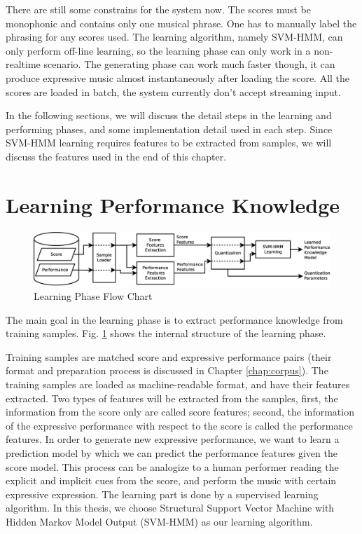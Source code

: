 There are still some constrains for the system now. The scores must be monophonic and contains only one musical phrase. One has to manually label the phrasing for any scores used. The learning algorithm, namely SVM-HMM, can only perform off-line learning, so the learning phase can only work in a non-realtime scenario. The generating phase can work much faster though, it can produce expressive music almost instantaneously after loading the score. All the scores are loaded in batch, the system currently don't accept streaming input.

In the following sections, we will discuss the detail steps in the learning and performing phases, and some implementation detail used in each step. Since SVM-HMM learning requires features to be extracted from samples, we will discuss the features used in the end of this chapter.


\section{Learning Performance Knowledge}
\label{sec:learn}
\begin{figure}[tp]
   \begin{center}
      \includegraphics[width=\textwidth]{fig/learn_arch}
   \end{center}
   \caption{Learning Phase Flow Chart} 
   \label{fig:learnflow}
\end{figure}
The main goal in the learning phase is to extract performance knowledge from training samples. Fig. \ref{fig:learnflow} shows the internal structure of the learning phase.

   Training samples are matched score and expressive performance pairs (their format and preparation process is discussed in Chapter \ref{chap:corpus}). The training samples are loaded as machine-readable format, and have their features extracted. Two types of features will be extracted from the samples, first, the information from the score only are called score features; second, the information of the expressive performance with respect to the score is called the performance features. In order to generate new expressive performance, we want to learn a prediction model by which we can predict the performance features given the score model. This process can be analogize to a human performer reading the explicit and implicit cues from the score, and perform the music with certain expressive expression. The learning part is done by a supervised learning algorithm. In this thesis, we choose Structural Support Vector Machine with Hidden Markov Model Output (SVM-HMM) as our learning algorithm.


